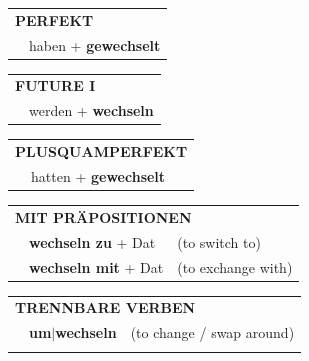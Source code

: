 \documentclass[10pt,a4paper]{revtex4-2}
\begin{document}
\begin{verbbox}
\vspace{10pt}

\begin{tabular}{rl}
\multicolumn{2}{l}{\textbf{PERFEKT}}\\
& haben + \textbf{gewechselt}\\
\end{tabular}
\hfill
\begin{tabular}{rl}
\multicolumn{2}{l}{\textbf{FUTURE I}}\\
& werden + \textbf{wechseln}\\
\end{tabular}
\hfill
\begin{tabular}{rl}
\multicolumn{2}{l}{\textbf{PLUSQUAMPERFEKT}}\\
& hatten + \textbf{gewechselt}\\
\end{tabular}

\vspace{10pt}

\begin{tabular}{lll}
\multicolumn{3}{l}{\textbf{MIT PRÄPOSITIONEN}}\\
& \textbf{wechseln zu} + Dat & (to switch to)\\
& \textbf{wechseln mit} + Dat & (to exchange with)\\
\end{tabular}
\hfill
\begin{tabular}{lll}
\multicolumn{3}{l}{\textbf{TRENNBARE VERBEN}}\\
& \textbf{um$|$wechseln} & (to change / swap around)\\
\vspace{10pt}
\end{tabular}
\vspace{-5pt}
\end{verbbox}
\end{document}

